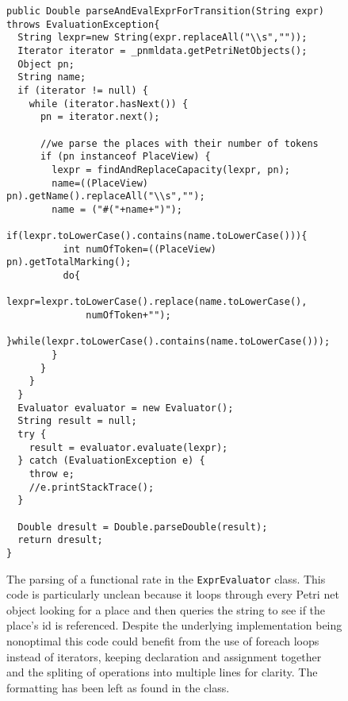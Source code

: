 \begin{figure}
\begin{lstlisting}[frame=single, 
                   ]
public Double parseAndEvalExprForTransition(String expr) throws EvaluationException{
  String lexpr=new String(expr.replaceAll("\\s",""));
  Iterator iterator = _pnmldata.getPetriNetObjects();
  Object pn;
  String name;
  if (iterator != null) {
    while (iterator.hasNext()) {
      pn = iterator.next();

      //we parse the places with their number of tokens
      if (pn instanceof PlaceView) {
        lexpr = findAndReplaceCapacity(lexpr, pn);
        name=((PlaceView) pn).getName().replaceAll("\\s","");
        name = ("#("+name+")");
        if(lexpr.toLowerCase().contains(name.toLowerCase())){
          int numOfToken=((PlaceView) pn).getTotalMarking();
          do{
            lexpr=lexpr.toLowerCase().replace(name.toLowerCase(),
              numOfToken+"");
          }while(lexpr.toLowerCase().contains(name.toLowerCase()));
        }
      }
    }
  }
  Evaluator evaluator = new Evaluator();
  String result = null;
  try {
    result = evaluator.evaluate(lexpr);
  } catch (EvaluationException e) {
    throw e;
    //e.printStackTrace();
  }

  Double dresult = Double.parseDouble(result);
  return dresult;
}
\end{lstlisting}
\caption{The parsing of a functional rate in the \texttt{ExprEvaluator} class. This code is particularly unclean because it loops through every Petri net object looking for a place and then queries the string to see if the place's id is referenced. Despite the underlying implementation being nonoptimal this code could benefit from the use of foreach loops instead of iterators, keeping declaration and assignment together and the spliting of operations into multiple lines for clarity. The formatting has been left as found in the class.}
\label{lst:expr_eval}
\end{figure}